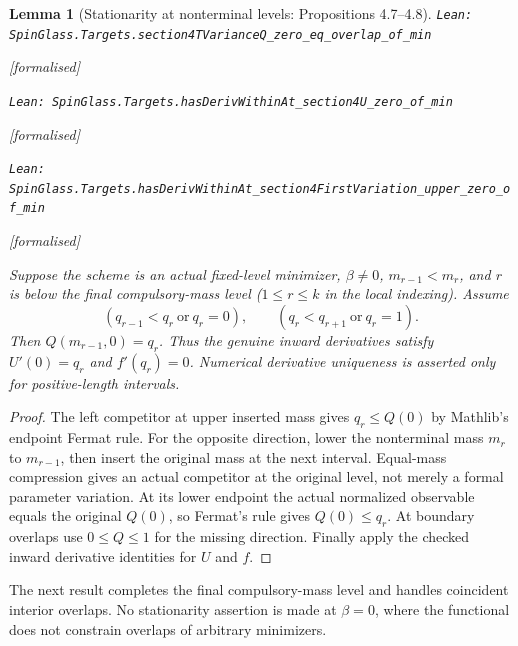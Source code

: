 \documentclass[11pt]{article}
\providecommand{\lean}[1]{\leavevmode\par\nopagebreak
  {\noindent\normalfont\footnotesize\raggedright\texttt{Lean: #1}\par}\nopagebreak}
\providecommand{\leanok}{\par\nopagebreak
  {\noindent\normalfont\footnotesize\textcolor{green!50!black}{[formalised]}\par}\nopagebreak}
\newtheorem{lemma}[theorem]{Lemma}
\begin{document}
\begin{lemma}[Stationarity at nonterminal levels: Propositions 4.7--4.8]
\lean{SpinGlass.Targets.section4TVarianceQ\_zero\_eq\_overlap\_of\_min}\leanok
\lean{SpinGlass.Targets.hasDerivWithinAt\_section4U\_zero\_of\_min}\leanok
\lean{SpinGlass.Targets.hasDerivWithinAt\_section4FirstVariation\_upper\_zero\_of\_min}\leanok
Suppose the scheme is an actual fixed-level minimizer, $\beta\ne0$,
$m_{r-1}<m_r$, and $r$ is below the final compulsory-mass level
($1\le r\le k$ in the local indexing). Assume
\[
 (q_{r-1}<q_r\ \text{or}\ q_r=0),\qquad
 (q_r<q_{r+1}\ \text{or}\ q_r=1).
\]
Then $Q(m_{r-1},0)=q_r$. Thus the genuine inward derivatives satisfy
$U'(0)=q_r$ and $f'(q_r)=0$. Numerical derivative uniqueness is asserted
only for positive-length intervals.
\end{lemma}
\begin{proof}
The left competitor at upper inserted mass gives $q_r\le Q(0)$ by
Mathlib's endpoint Fermat rule. For the opposite direction, lower the
nonterminal mass $m_r$ to $m_{r-1}$, then insert the original mass at the
next interval. Equal-mass compression gives an actual competitor at the
original level, not merely a formal parameter variation. At its lower
endpoint the actual normalized observable equals the original $Q(0)$,
so Fermat's rule gives $Q(0)\le q_r$. At boundary overlaps use $0\le Q\le1$
for the missing direction. Finally apply the checked inward derivative
identities for $U$ and $f$.
\end{proof}
The next result completes the final compulsory-mass level and handles
coincident interior overlaps. No stationarity assertion is made at $\beta=0$,
where the functional does not constrain overlaps of arbitrary minimizers.
\end{document}
